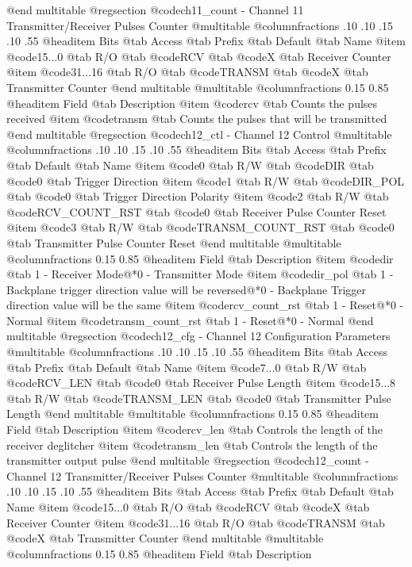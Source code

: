 @end multitable
@regsection @code{ch11_count} - Channel 11 Transmitter/Receiver Pulses Counter
@multitable @columnfractions .10 .10 .15 .10 .55
@headitem Bits @tab Access @tab Prefix @tab Default @tab Name
@item @code{15...0}
@tab R/O @tab
@code{RCV}
@tab @code{X} @tab 
Receiver Counter
@item @code{31...16}
@tab R/O @tab
@code{TRANSM}
@tab @code{X} @tab 
Transmitter Counter
@end multitable
@multitable @columnfractions 0.15 0.85
@headitem Field @tab Description
@item @code{rcv} @tab Counts the pulses received
@item @code{transm} @tab Counts the pulses that will be transmitted
@end multitable
@regsection @code{ch12_ctl} - Channel 12 Control
@multitable @columnfractions .10 .10 .15 .10 .55
@headitem Bits @tab Access @tab Prefix @tab Default @tab Name
@item @code{0}
@tab R/W @tab
@code{DIR}
@tab @code{0} @tab 
Trigger Direction
@item @code{1}
@tab R/W @tab
@code{DIR_POL}
@tab @code{0} @tab 
Trigger Direction Polarity
@item @code{2}
@tab R/W @tab
@code{RCV_COUNT_RST}
@tab @code{0} @tab 
Receiver Pulse Counter Reset
@item @code{3}
@tab R/W @tab
@code{TRANSM_COUNT_RST}
@tab @code{0} @tab 
Transmitter Pulse Counter Reset
@end multitable
@multitable @columnfractions 0.15 0.85
@headitem Field @tab Description
@item @code{dir} @tab 1 - Receiver Mode@*0 - Transmitter Mode
@item @code{dir_pol} @tab 1 - Backplane trigger direction value will be reversed@*0 - Backplane Trigger direction value will be the same
@item @code{rcv_count_rst} @tab 1 - Reset@*0 - Normal
@item @code{transm_count_rst} @tab 1 - Reset@*0 - Normal
@end multitable
@regsection @code{ch12_cfg} - Channel 12 Configuration Parameters
@multitable @columnfractions .10 .10 .15 .10 .55
@headitem Bits @tab Access @tab Prefix @tab Default @tab Name
@item @code{7...0}
@tab R/W @tab
@code{RCV_LEN}
@tab @code{0} @tab 
Receiver Pulse Length
@item @code{15...8}
@tab R/W @tab
@code{TRANSM_LEN}
@tab @code{0} @tab 
Transmitter Pulse Length
@end multitable
@multitable @columnfractions 0.15 0.85
@headitem Field @tab Description
@item @code{rcv_len} @tab Controls the length of the receiver deglitcher
@item @code{transm_len} @tab Controls the length of the transmitter output pulse
@end multitable
@regsection @code{ch12_count} - Channel 12 Transmitter/Receiver Pulses Counter
@multitable @columnfractions .10 .10 .15 .10 .55
@headitem Bits @tab Access @tab Prefix @tab Default @tab Name
@item @code{15...0}
@tab R/O @tab
@code{RCV}
@tab @code{X} @tab 
Receiver Counter
@item @code{31...16}
@tab R/O @tab
@code{TRANSM}
@tab @code{X} @tab 
Transmitter Counter
@end multitable
@multitable @columnfractions 0.15 0.85
@headitem Field @tab Description

